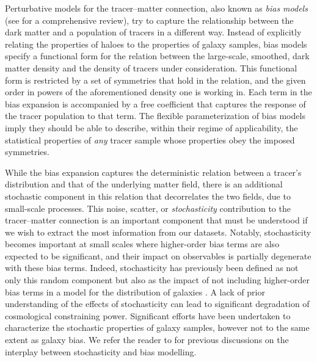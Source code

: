 \documentclass[fleqn,usenatbib]{mnras}
\begin{document}
Perturbative models for the tracer--matter connection, also known as \emph{bias models} (see \citealt{Desjacques:2016bnm} for a comprehensive review), try to capture the relationship between the dark matter and a population of tracers in a different way. Instead of explicitly relating the properties of haloes to the properties of galaxy samples, bias models specify a functional form for the relation between the large-scale, smoothed, dark matter density and the density of tracers under consideration. This functional form is restricted by a set of symmetries that hold in the relation, and the given order in powers of the aforementioned density one is working in. Each term in the bias expansion is accompanied by a free coefficient that captures the response of the tracer population to that term. The flexible parameterization of bias models imply they should be able to describe, within their regime of applicability, the statistical properties of \emph{any} tracer sample whose properties obey the imposed symmetries.\par 
While the bias expansion captures the deterministic relation between a tracer's distribution and that of the underlying matter field, there is an additional stochastic component in this relation that decorrelates the two fields, due to small-scale processes. This noise, scatter, or \emph{stochasticity} contribution to the tracer--matter connection is an important component that must be understood if we wish to extract the most information from our datasets. Notably, stochasticity becomes important at small scales where higher-order bias terms are also expected to be significant, and their impact on observables is partially degenerate with these bias terms. Indeed, stochasticity has previously been defined as not only this random component but also as the impact of not including higher-order bias terms in a model for the distribution of galaxies \citep{Baldauf_2013}. A lack of prior understanding of the effects of stochasticity can lead to significant degradation of cosmological constraining power. Significant efforts have been undertaken to characterize the stochastic properties of galaxy samples, however not to the same extent as galaxy bias. We refer the reader to \citet{Baldauf_2016,Paech_2017,Ginzburg_2017,friedrich2021pdf,Sullivan21} for previous discussions on the interplay between stochasticity and bias modelling. \par 
\end{document}
